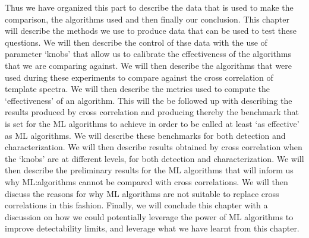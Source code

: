 Thus we have organized this part to describe the data that is used to make the comparison, the algorithms used and then finally our conclusion.
This chapter will describe the methods we use to produce data that can be used to test these questions.
We will then describe the control of thse data with the use of parameter `knobs' that allow us to calibrate the effectiveness of the algorithms that we are comparing against.
We will then describe the algorithms that were used during these experiments to compare against the cross correlation of template spectra. 
We will then describe the metrics used to compute the `effectiveness' of an algorithm.
This will the be followed up with describing the results produced by cross correlation and producing thereby the benchmark that is set for the ML algorithms to achieve in order to be called at least `as effective' as ML algorithms.
We will describe these benchmarks for both detection and characterization.
We will then describe results obtained by  cross correlation when the `knobs' are at different levels, for both detection and characterization.
We will then describe the preliminary results for the ML algorithms that will inform us why ML:algorithms cannot be compared with cross correlations.
We will then discuss the reasons for why ML algorithms are not suitable to replace cross correlations in this fashion.
Finally, we will conclude this chapter with a discussion on how we could potentially leverage the power of ML algorithms to improve detectability limits, and leverage what we have learnt from this chapter.

